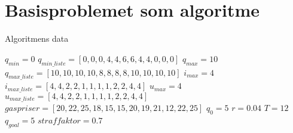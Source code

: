 \section{Basisproblemet som algoritme}
\begin{algorithm}[H] 
\caption{Algoritmens data}
\begin{algorithmic}[1]
\State $q_{min}=0$
\State $q_{min\_liste}=[0,0,0,4,4,6,6,4,4,0,0,0]$
\State $q_{max}=10$
\State $q_{max\_liste}=[10,10,10,10,8,8,8,8,10,10,10,10]$
\State $i_{max}=4$
\State $i_{max\_liste}=[4,4,2,2,1,1,1,1,2,2,4,4]$
\State $u_{max}=4$
\State $u_{max\_liste}=[4,4,2,2,1,1,1,1,2,2,4,4]$
\State $gaspriser=[20,22,25,18,15,15,20,19,21,12,22,25]$
\State $q_{0}=5$
\State $r=0.04$
\State $T=12$
\State $q_{goal}=5$
\State $straffaktor=0.7$

\end{algorithmic}
\label{alg:basis}
\end{algorithm}